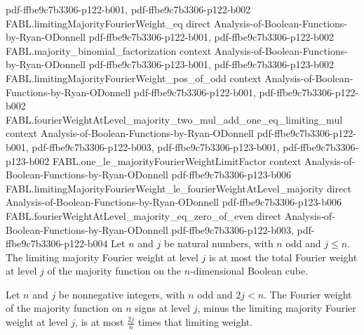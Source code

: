 \begin{theorem}
  {pdf-ffbe9c7b3306-p122-b001,
    pdf-ffbe9c7b3306-p122-b002}
\proofstep
  {FABL.limitingMajorityFourierWeight_eq}
  {direct}
  {Analysis-of-Boolean-Functions-by-Ryan-ODonnell}
  {pdf-ffbe9c7b3306-p122-b001,
    pdf-ffbe9c7b3306-p122-b002}
\proofstep
  {FABL.majority_binomial_factorization}
  {context}
  {Analysis-of-Boolean-Functions-by-Ryan-ODonnell}
  {pdf-ffbe9c7b3306-p123-b001,
    pdf-ffbe9c7b3306-p123-b002}
\proofstep
  {FABL.limitingMajorityFourierWeight_pos_of_odd}
  {context}
  {Analysis-of-Boolean-Functions-by-Ryan-ODonnell}
  {pdf-ffbe9c7b3306-p122-b001,
    pdf-ffbe9c7b3306-p122-b002}
\proofstep
  {FABL.fourierWeightAtLevel_majority_two_mul_add_one_eq_limiting_mul}
  {context}
  {Analysis-of-Boolean-Functions-by-Ryan-ODonnell}
  {pdf-ffbe9c7b3306-p122-b001,
    pdf-ffbe9c7b3306-p122-b003,
    pdf-ffbe9c7b3306-p123-b001,
    pdf-ffbe9c7b3306-p123-b002}
\proofstep
  {FABL.one_le_majorityFourierWeightLimitFactor}
  {context}
  {Analysis-of-Boolean-Functions-by-Ryan-ODonnell}
  {pdf-ffbe9c7b3306-p123-b006}
\proofstep
  {FABL.limitingMajorityFourierWeight_le_fourierWeightAtLevel_majority}
  {direct}
  {Analysis-of-Boolean-Functions-by-Ryan-ODonnell}
  {pdf-ffbe9c7b3306-p123-b006}
\proofstep
  {FABL.fourierWeightAtLevel_majority_eq_zero_of_even}
  {direct}
  {Analysis-of-Boolean-Functions-by-Ryan-ODonnell}
  {pdf-ffbe9c7b3306-p122-b003,
    pdf-ffbe9c7b3306-p122-b004}
Let $n$ and $j$ be natural numbers, with $n$ odd and $j\le n$. The limiting majority
Fourier weight at level $j$ is at most the total Fourier weight at level $j$ of the
majority function on the $n$-dimensional Boolean cube.
\end{theorem}

\begin{theorem}
\label{FABL.finite_level_sub_limitingMajorityFourierWeight_le}
\leanok
{}
Let $n$ and $j$ be nonnegative integers, with $n$ odd and $2j<n$. The Fourier weight of
the majority function on $n$ signs at level $j$, minus the limiting majority Fourier
weight at level $j$, is at most $\frac{2j}{n}$ times that limiting weight.
\end{theorem}

